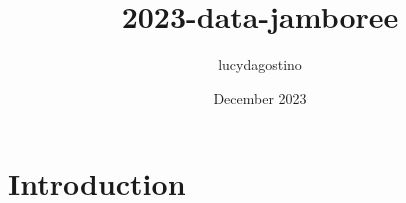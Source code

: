 \documentclass{article}
\title{2023-data-jamboree}
\author{lucydagostino }
\date{December 2023}
\begin{document}
\maketitle

\section{Introduction}
\end{document}
